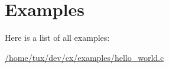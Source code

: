 \section{Examples}
Here is a list of all examples\+:\begin{DoxyCompactItemize}
\item 
\hyperlink{_2home_2tux_2dev_2cx_2examples_2hello_world_8c-example}{/home/tux/dev/cx/examples/hello\+\_\+world.\+c}
\end{DoxyCompactItemize}

